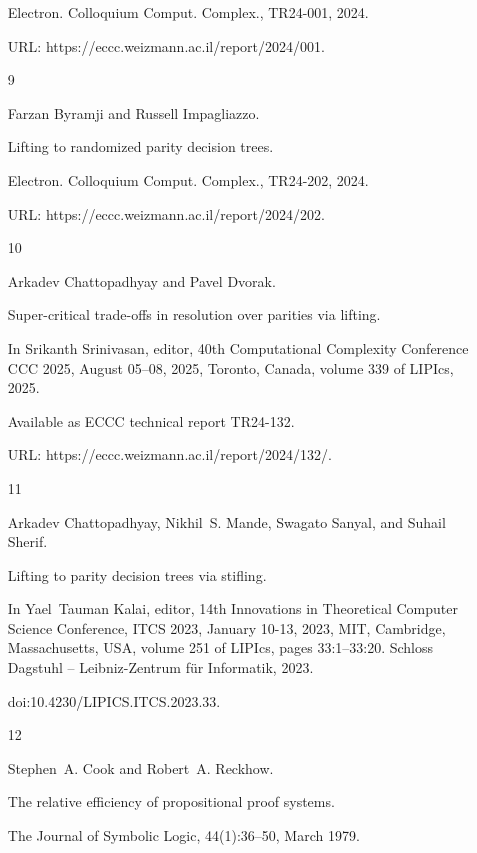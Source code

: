 \begin{itemize}
Electron. Colloquium Comput. Complex., TR24-001, 2024.


URL: https://eccc.weizmann.ac.il/report/2024/001.





\item 
[9]

Farzan Byramji and Russell Impagliazzo.


Lifting to randomized parity decision trees.


Electron. Colloquium Comput. Complex., TR24-202, 2024.


URL: https://eccc.weizmann.ac.il/report/2024/202.





\item 
[10]

Arkadev Chattopadhyay and Pavel Dvorak.


Super-critical trade-offs in resolution over parities via lifting.


In Srikanth Srinivasan, editor, 40th Computational Complexity
Conference CCC 2025, August 05–08, 2025, Toronto, Canada, volume 339 of
LIPIcs, 2025.


Available as ECCC technical report TR24-132.


URL: https://eccc.weizmann.ac.il/report/2024/132/.





\item 
[11]

Arkadev Chattopadhyay, Nikhil S. Mande, Swagato Sanyal, and Suhail Sherif.


Lifting to parity decision trees via stifling.


In Yael Tauman Kalai, editor, 14th Innovations in Theoretical
Computer Science Conference, ITCS 2023, January 10-13, 2023, MIT,
Cambridge, Massachusetts, USA, volume 251 of LIPIcs, pages
33:1–33:20. Schloss Dagstuhl – Leibniz-Zentrum für Informatik, 2023.


doi:10.4230/LIPICS.ITCS.2023.33.





\item 
[12]

Stephen A. Cook and Robert A. Reckhow.


The relative efficiency of propositional proof systems.


The Journal of Symbolic Logic, 44(1):36–50, March 1979.



\end{itemize}
